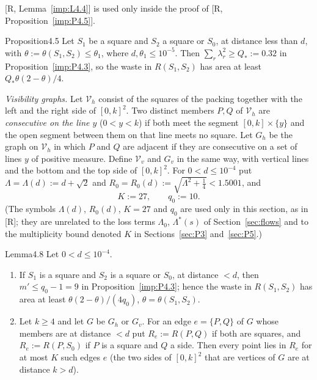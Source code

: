 \documentclass[11pt]{amsart}
\theoremstyle{definition}
\theoremstyle{remark}
\numberwithin{equation}{section}
\begin{document}
[R, Lemma~\ref{imp:L4.4}] is used only inside the proof of [R, Proposition~\ref{imp:P4.5}].

\begin{ImpStatement}{Proposition}{4.5}\label{imp:P4.5}
Let $S_1$ be a square and $S_2$ a square or $S_0$, at distance less than $d$, with $\theta:=\theta(S_1,S_2)\le\theta_1$, where
$d,\theta_1\le10^{-5}$. Then $\sum_r\lambda_r^2\ge Q_*:=0.32$ in Proposition~\ref{imp:P4.3}, so the waste in $R(S_1,S_2)$ has
area at least $Q_*\theta(2-\theta)/4$.
\end{ImpStatement}

\emph{Visibility graphs.}
Let $\mathcal V_h$ consist of the squares of the packing together with the left and the right side of $[0,k]^2$. Two
distinct members $P,Q$ of $\mathcal V_h$ are \emph{consecutive on the line $y$} ($0<y<k$) if both meet the segment
$[0,k]\times\{y\}$ and the open segment between them on that line meets no square. Let $G_h$ be the graph on
$\mathcal V_h$ in which $P$ and $Q$ are adjacent if they are consecutive on a set of lines $y$ of positive measure.
Define $\mathcal V_v$ and $G_v$ in the same way, with vertical lines and the bottom and the top side of $[0,k]^2$.
For $0<d\le10^{-4}$ put $\Lambda=\Lambda(d):=d+\sqrt2$ and $R_0=R_0(d):=\sqrt{\Lambda^2+\frac14}<1.5001$, and
\[
K:=27,\qquad q_0:=10 .
\]
(The symbols $\Lambda(d)$, $R_0(d)$, $K=27$ and $q_0$ are used only in this section, as in [R]; they are unrelated to the
loss terms $\Lambda_0$, $\Lambda^*(s)$ of Section~\ref{sec:flows} and to the multiplicity bound denoted $K$ in
Sections~\ref{sec:P3} and~\ref{sec:P5}.)

\begin{ImpStatement}{Lemma}{4.8}\label{imp:L4.8}
Let $0<d\le10^{-4}$.
\begin{enumerate}[label=(\alph*)]
\item If $S_1$ is a square and $S_2$ is a square or $S_0$, at distance $<d$, then $m'\le q_0-1=9$ in
Proposition~\ref{imp:P4.3}; hence the waste in $R(S_1,S_2)$ has area at least $\theta(2-\theta)/(4q_0)$, $\theta=\theta(S_1,S_2)$.
\item Let $k\ge4$ and let $G$ be $G_h$ or $G_v$. For an edge $e=\{P,Q\}$ of $G$ whose members are at distance $<d$ put $R_e:=R(P,Q)$ if
both are squares, and $R_e:=R(P,S_0)$ if $P$ is a square and $Q$ a side. Then every point lies in $R_e$ for at most $K$
such edges $e$ \textup{(}the two sides of $[0,k]^2$ that are vertices of $G$ are at distance $k>d$\textup{)}.
\end{enumerate}
\end{ImpStatement}
\end{document}
